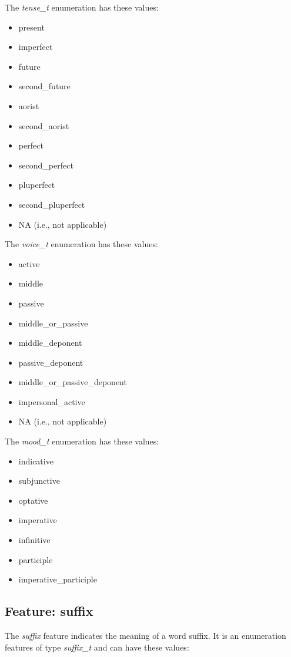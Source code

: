 \documentclass[11pt,oneside,a4paper]{memoir}
\begin{document}
The \emph{tense\_t} enumeration has these values:

\begin{itemize}
\item present
\item imperfect
\item future
\item second\_future
\item aorist
\item second\_aorist
\item perfect
\item second\_perfect
\item pluperfect
\item second\_pluperfect
\item NA (i.e., not applicable)
\end{itemize}

The \emph{voice\_t} enumeration has these values:

\begin{itemize}
\item active
\item middle
\item passive
\item middle\_or\_passive
\item middle\_deponent
\item passive\_deponent
\item middle\_or\_passive\_deponent
\item impersonal\_active
\item NA (i.e., not applicable)
\end{itemize}

The \emph{mood\_t} enumeration has these values:

\begin{itemize}
\item indicative
\item subjunctive
\item optative
\item imperative
\item infinitive
\item participle
\item imperative\_participle
\end{itemize}


\subsection{Feature: suffix}

The \emph{suffix} feature indicates the meaning of a word suffix. It is an enumeration features of
type \emph{suffix\_t} and can have these values:
\end{document}
